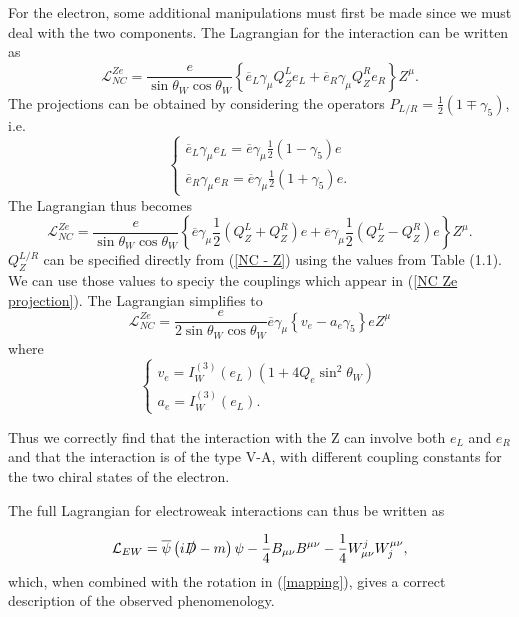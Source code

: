 \documentclass[10pt,a4paper]{book}
\begin{document}
For the electron, some additional manipulations must first be made since we must deal with the two components. The Lagrangian for the interaction can be written as
\begin{equation}
\mathcal{L}_{NC}^{Ze} = \frac{e}{\sin\theta_W\cos\theta_W}\left\lbrace \overline{e}_L \gamma_\mu Q_Z^L e_L + \overline{e}_R \gamma_\mu Q_Z^R e_R  \right\rbrace Z^\mu.
\end{equation}
The projections can be obtained by considering the operators $P_{L/R} = \frac{1}{2}\left(1 \mp \gamma_5\right)$, i.e.
\begin{equation}
\begin{cases}
\overline{e}_L \gamma_\mu e_L = \overline{e} \gamma_\mu \frac{1}{2}\left(1-\gamma_5\right)e \\
\overline{e}_R \gamma_\mu e_R = \overline{e} \gamma_\mu \frac{1}{2}\left(1+\gamma_5\right)e .
\end{cases}
\end{equation}
The Lagrangian thus becomes
\begin{equation}
\label{NC Ze projection}
\mathcal{L}_{NC}^{Ze} = \frac{e}{\sin\theta_W\cos\theta_W}\left\lbrace \overline{e}\gamma_\mu\frac{1}{2}(Q^L_Z + Q^R_Z)e + \overline{e}\gamma_\mu\frac{1}{2}(Q^L_Z - Q^R_Z)e  \right\rbrace Z^\mu.
\end{equation}
$Q_Z^{L/R}$ can be specified directly from (\ref{NC - Z}) using the values from Table (1.1). We can use those values to speciy the couplings which appear in (\ref{NC Ze projection}). The Lagrangian simplifies to
\begin{equation}
\mathcal{L}^{Ze}_{NC} = \frac{e}{2\sin\theta_W\cos\theta_W} \overline{e}\gamma_\mu \left\lbrace v_e - a_e \gamma_5\right\rbrace e Z^\mu
\end{equation} 
where
\begin{equation}
\begin{cases}
v_e = I^{(3)}_W (e_L) \left( 1 + 4Q_e\sin^2\theta_W \right) \\
a_e = I^{(3)}_W (e_L).
\end{cases}
\end{equation}

Thus we correctly find that the interaction with the Z can involve both $e_L$ and $e_R$ and that the interaction is of the type V-A, with different coupling constants for the two chiral states of the electron. 

The full Lagrangian for electroweak interactions can thus be written as

\begin{equation}
\label{EW lagrangian}
\mathcal{L}_{EW} = \overline{\psi}\left(i\slashed{D} - m\right)\psi - \frac{1}{4}B_{\mu\nu}B^{\mu\nu} - \frac{1}{4}W^j_{\mu\nu}W_j^{\mu\nu},
\end{equation}
which, when combined with the rotation in (\ref{mapping}), gives a correct description of the observed phenomenology.
\end{document}
